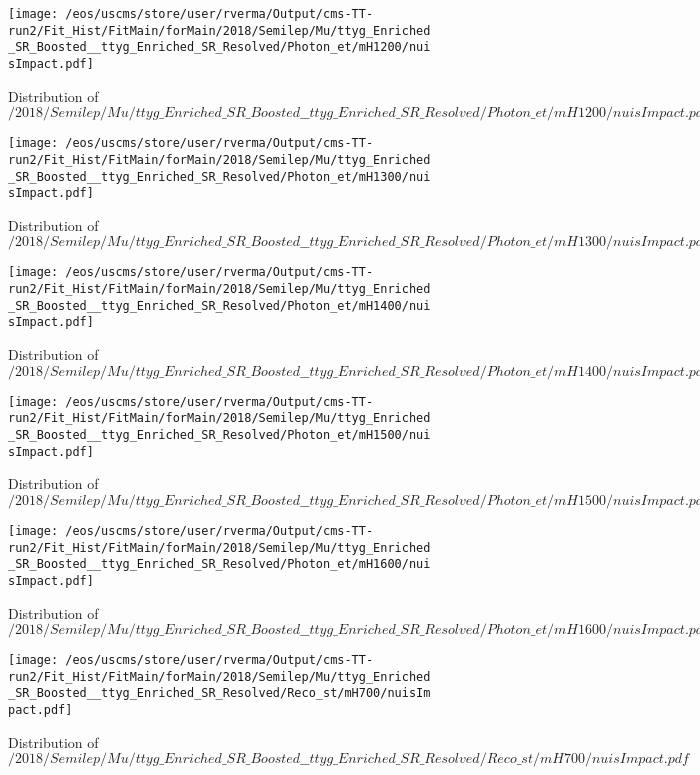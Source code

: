 \begin{figure}
\centering
\texttt{[image: /eos/uscms/store/user/rverma/Output/cms-TT-run2/Fit\_Hist/FitMain/forMain/2018/Semilep/Mu/ttyg\_Enriched\_SR\_Boosted\_\_ttyg\_Enriched\_SR\_Resolved/Photon\_et/mH1200/nuisImpact.pdf]}
\caption{Distribution of $/2018/Semilep/Mu/ttyg\_Enriched\_SR\_Boosted\_\_ttyg\_Enriched\_SR\_Resolved/Photon\_et/mH1200/nuisImpact.pdf$}
\end{figure}

\begin{figure}
\centering
\texttt{[image: /eos/uscms/store/user/rverma/Output/cms-TT-run2/Fit\_Hist/FitMain/forMain/2018/Semilep/Mu/ttyg\_Enriched\_SR\_Boosted\_\_ttyg\_Enriched\_SR\_Resolved/Photon\_et/mH1300/nuisImpact.pdf]}
\caption{Distribution of $/2018/Semilep/Mu/ttyg\_Enriched\_SR\_Boosted\_\_ttyg\_Enriched\_SR\_Resolved/Photon\_et/mH1300/nuisImpact.pdf$}
\end{figure}

\begin{figure}
\centering
\texttt{[image: /eos/uscms/store/user/rverma/Output/cms-TT-run2/Fit\_Hist/FitMain/forMain/2018/Semilep/Mu/ttyg\_Enriched\_SR\_Boosted\_\_ttyg\_Enriched\_SR\_Resolved/Photon\_et/mH1400/nuisImpact.pdf]}
\caption{Distribution of $/2018/Semilep/Mu/ttyg\_Enriched\_SR\_Boosted\_\_ttyg\_Enriched\_SR\_Resolved/Photon\_et/mH1400/nuisImpact.pdf$}
\end{figure}

\begin{figure}
\centering
\texttt{[image: /eos/uscms/store/user/rverma/Output/cms-TT-run2/Fit\_Hist/FitMain/forMain/2018/Semilep/Mu/ttyg\_Enriched\_SR\_Boosted\_\_ttyg\_Enriched\_SR\_Resolved/Photon\_et/mH1500/nuisImpact.pdf]}
\caption{Distribution of $/2018/Semilep/Mu/ttyg\_Enriched\_SR\_Boosted\_\_ttyg\_Enriched\_SR\_Resolved/Photon\_et/mH1500/nuisImpact.pdf$}
\end{figure}

\begin{figure}
\centering
\texttt{[image: /eos/uscms/store/user/rverma/Output/cms-TT-run2/Fit\_Hist/FitMain/forMain/2018/Semilep/Mu/ttyg\_Enriched\_SR\_Boosted\_\_ttyg\_Enriched\_SR\_Resolved/Photon\_et/mH1600/nuisImpact.pdf]}
\caption{Distribution of $/2018/Semilep/Mu/ttyg\_Enriched\_SR\_Boosted\_\_ttyg\_Enriched\_SR\_Resolved/Photon\_et/mH1600/nuisImpact.pdf$}
\end{figure}

\begin{figure}
\centering
\texttt{[image: /eos/uscms/store/user/rverma/Output/cms-TT-run2/Fit\_Hist/FitMain/forMain/2018/Semilep/Mu/ttyg\_Enriched\_SR\_Boosted\_\_ttyg\_Enriched\_SR\_Resolved/Reco\_st/mH700/nuisImpact.pdf]}
\caption{Distribution of $/2018/Semilep/Mu/ttyg\_Enriched\_SR\_Boosted\_\_ttyg\_Enriched\_SR\_Resolved/Reco\_st/mH700/nuisImpact.pdf$}
\end{figure}

